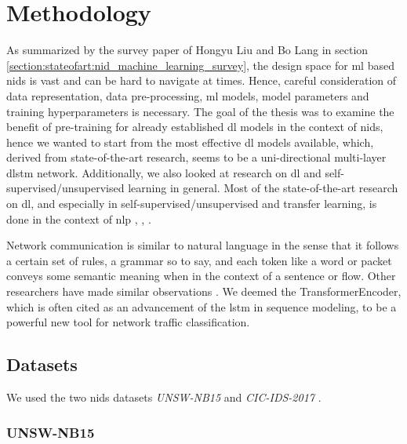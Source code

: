\chapter{Methodology} \label{sec:methodology}

As summarized by the survey paper \cite{nid_ml_survey_2019} of Hongyu Liu and Bo Lang in section \ref{section:stateofart:nid_machine_learning_survey}, the design space for \gls{ml} based \gls{nids} is vast and can be hard to navigate at times. Hence, careful consideration of data representation, data pre-processing, \gls{ml} models, model parameters and training hyperparameters is necessary. The goal of the thesis was to examine the benefit of pre-training for already established \gls{dl} models in the context of \gls{nids}, hence we wanted to start from the most effective \gls{dl} models available, which, derived from state-of-the-art research, seems to be a uni-directional multi-layer \gls{dlstm} network. Additionally, we also looked at research on \gls{dl} and self-supervised/unsupervised learning in general. Most of the state-of-the-art research on \gls{dl}, and especially in self-supervised/unsupervised and transfer learning, is done in the context of \gls{nlp} \cite{bert}, \cite{elmo}, \cite{attention}.

Network communication is similar to natural language in the sense that it follows a certain set of rules, a grammar so to say, and each token like a word or packet conveys some semantic meaning when in the context of a sentence or flow. Other researchers have made similar observations \cite{anomaly_detection_recurrent_neural_networks}. We deemed the TransformerEncoder, which is often cited as an advancement of the \gls{lstm} in sequence modeling, to be a powerful new tool for network traffic classification. 

\section{Datasets} \label{sec:methodology:datasets}

We used the two \gls{nids} datasets \textit{UNSW-NB15} \cite{unsw_nb15} and \textit{CIC-IDS-2017} \cite{cic_ids_2017}. \par

\subsection{UNSW-NB15} \label{sec:methodology:datasets:unsw_nb15}

